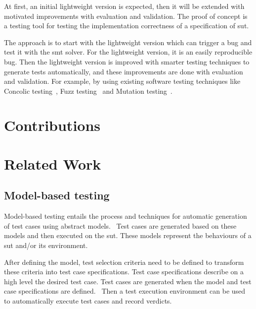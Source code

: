 At first, an initial lightweight version is expected, then it will be extended with motivated
improvements with evaluation and validation. The proof of concept is a testing
tool for testing the implementation correctness of a specification of \gls{sut}.

The
approach is to start with the lightweight version which can trigger a bug and
test it with the \gls{smt} solver. For the lightweight version, it is an easily
reproducible bug. Then the lightweight version is improved with smarter
testing techniques to generate tests automatically, and these improvements are done
with evaluation and validation. For example, by using existing software testing
techniques like Concolic testing~\cite{sen2007concolic}, Fuzz testing~\cite{godefroid2008automated} and Mutation testing~\cite{jia2011analysis}.

\section{Contributions}
%

\section{Related Work}

\subsection*{Model-based testing}

Model-based testing entails the process and techniques for automatic generation
of test cases using abstract models.~\cite{utting2012taxonomy, tretmans2008model, dalal1999model}
Test cases are generated based on these models and then executed on the
\gls{sut}. These models represent the behaviours of a \gls{sut} and/or its
environment.~\cite{utting2012taxonomy, tretmans2008model}

After defining the model, test selection criteria need to be defined to
transform these criteria into test case specifications. Test case specifications
describe on a high level the desired test case. Test cases are generated when
the model and test case specifications are defined.~\cite{utting2012taxonomy}
Then a test execution environment can be used to automatically execute test
cases and record verdicts.

